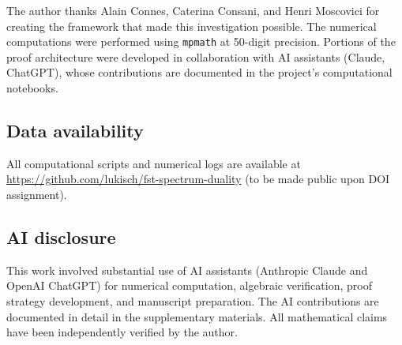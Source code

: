 \documentclass[12pt,a4paper]{article}
\theoremstyle{definition}
\theoremstyle{remark}
\begin{document}
The author thanks Alain Connes, Caterina Consani, and Henri Moscovici
for creating the framework that made this investigation possible.
The numerical computations were performed using \texttt{mpmath}
\cite{mpmath} at 50-digit precision.
Portions of the proof architecture were developed in collaboration
with AI assistants (Claude, ChatGPT), whose contributions are
documented in the project's computational notebooks.

\subsection*{Data availability}

All computational scripts and numerical logs are available at
\url{https://github.com/lukisch/fst-spectrum-duality} (to be made
public upon DOI assignment).

\subsection*{AI disclosure}

This work involved substantial use of AI assistants (Anthropic Claude
and OpenAI ChatGPT) for numerical computation, algebraic verification,
proof strategy development, and manuscript preparation.
The AI contributions are documented in detail in the supplementary
materials.
All mathematical claims have been independently verified by the author.

\end{document}
